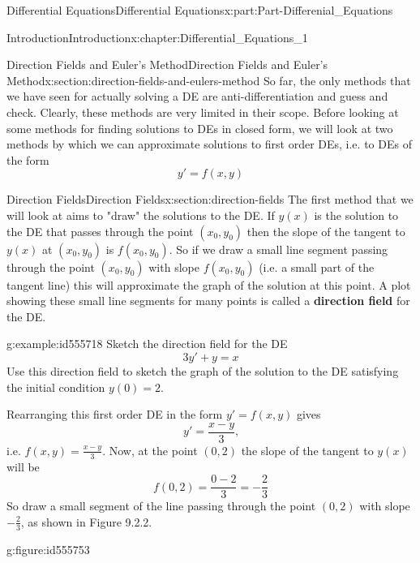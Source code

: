 \documentclass[oneside,10pt,]{book}
\newcommand{\terminology}[1]{\textbf{#1}}
\numberwithin{equation}{section}
\begin{document}
\begin{partptx}{Differential Equations}{}{Differential Equations}{}{}{x:part:Part-Differenial_Equations}
\begin{chapterptx}{Introduction}{}{Introduction}{}{}{x:chapter:Differential_Equations_1}
\typeout{************************************************}
%
\begin{sectionptx}{Direction Fields and Euler's Method}{}{Direction Fields and Euler's Method}{}{}{x:section:direction-fields-and-eulers-method}
So far, the only methods that we have seen for actually solving a DE are anti-differentiation and guess and check. Clearly, these methods are very limited in their scope. Before looking at some methods for finding solutions to DEs in closed form, we will look at two methods by which we can approximate solutions to first order DEs, i.e. to DEs of the form%
\begin{equation*}
y'=f(x,y)
\end{equation*}
%
%
%
\typeout{************************************************}
\typeout{************************************************}
%
\begin{sectionptx}{Direction Fields}{}{Direction Fields}{}{}{x:section:direction-fields}
The first method that we will look at aims to "draw" the solutions to the DE. If \(y(x)\) is the solution to the DE that passes through the point \((x_0,y_0)\) then the slope of the tangent to \(y(x)\) at \((x_0,y_0)\) is \(f(x_0,y_0)\). So if we draw a small line segment passing through the point \((x_0,y_0)\) with slope \(f(x_0,y_0)\) (i.e. a small part of the tangent line) this will approximate the graph of the solution at this point. A plot showing these small line segments for many points is called a \terminology{direction field} for the DE.%
\begin{example}{}{g:example:id555718}%
Sketch the direction field for the DE%
\begin{equation*}
3y'+y=x
\end{equation*}
Use this direction field to sketch the graph of the solution to the DE satisfying the initial condition \(y(0)=2\).%
\par\smallskip%
\noindent\hypertarget{g:solution:id555725}{}Rearranging this first order DE in the form \(y'=f(x,y)\) gives%
\begin{equation*}
y'=\frac{x-y}{3}\text{,}
\end{equation*}
i.e. \(f(x,y)=\frac{x-y}{3}\). Now, at the point \((0,2)\) the slope of the tangent to \(y(x)\) will be%
\begin{equation*}
f(0,2)=\frac{0-2}{3}=-\frac{2}{3}
\end{equation*}
So draw a small segment of the line passing through the point \((0,2)\) with slope \(-\frac{2}{3}\), as shown in Figure 9.2.2. \begin{figureptx}{}{g:figure:id555753}{}%

\end{figureptx}
\end{example}
\end{sectionptx}
\end{sectionptx}
\end{chapterptx}
\end{partptx}
\end{document}
